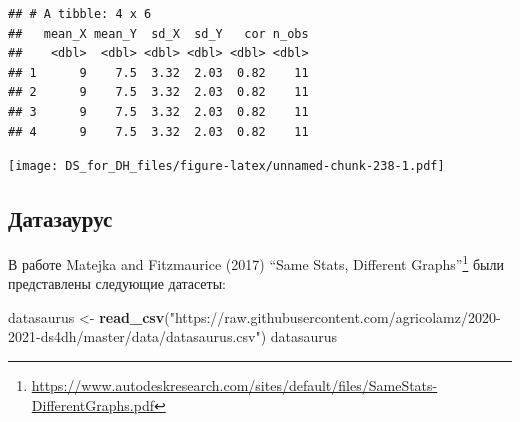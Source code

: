 \documentclass[
]{book}
\newenvironment{Shaded}{\begin{snugshade}}{\end{snugshade}}
\newcommand{\DataTypeTok}[1]{\textcolor[rgb]{0.13,0.29,0.53}{#1}}
\newcommand{\DecValTok}[1]{\textcolor[rgb]{0.00,0.00,0.81}{#1}}
\newcommand{\KeywordTok}[1]{\textcolor[rgb]{0.13,0.29,0.53}{\textbf{#1}}}
\newcommand{\NormalTok}[1]{#1}
\newcommand{\OperatorTok}[1]{\textcolor[rgb]{0.81,0.36,0.00}{\textbf{#1}}}
\newcommand{\StringTok}[1]{\textcolor[rgb]{0.31,0.60,0.02}{#1}}
\renewcommand{\href}[2]{#2\footnote{\url{#1}}}
\begin{document}
\begin{Shaded}
\end{Shaded}

\begin{verbatim}
## # A tibble: 4 x 6
##   mean_X mean_Y  sd_X  sd_Y   cor n_obs
##    <dbl>  <dbl> <dbl> <dbl> <dbl> <dbl>
## 1      9    7.5  3.32  2.03  0.82    11
## 2      9    7.5  3.32  2.03  0.82    11
## 3      9    7.5  3.32  2.03  0.82    11
## 4      9    7.5  3.32  2.03  0.82    11
\end{verbatim}

\texttt{[image: DS\_for\_DH\_files/figure-latex/unnamed-chunk-238-1.pdf]}

\hypertarget{ux434ux430ux442ux430ux437ux430ux443ux440ux443ux441}{%
\subsection{Датазаурус}\label{ux434ux430ux442ux430ux437ux430ux443ux440ux443ux441}}

В работе \href{https://www.autodeskresearch.com/sites/default/files/SameStats-DifferentGraphs.pdf}{Matejka and Fitzmaurice (2017) ``Same Stats, Different Graphs''} были представлены следующие датасеты:

\begin{Shaded}
\begin{Highlighting}[]
\NormalTok{datasaurus <-}\StringTok{ }\KeywordTok{read_csv}\NormalTok{(}\StringTok{"https://raw.githubusercontent.com/agricolamz/2020-2021-ds4dh/master/data/datasaurus.csv"}\NormalTok{)}
\NormalTok{datasaurus}
\end{Highlighting}
\end{Shaded}
\end{document}
